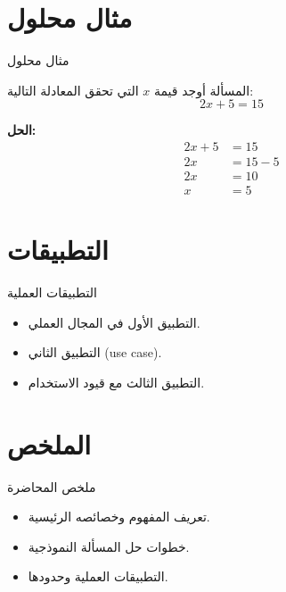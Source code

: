 \documentclass[aspectratio=169,11pt]{beamer}
\let\textEN\textenglish
\begin{document}
\section{مثال محلول}

\begin{frame}{مثال محلول}
\begin{block}{المسألة}
أوجد قيمة $x$ التي تحقق المعادلة التالية:
\[
2x + 5 = 15
\]
\end{block}

\textbf{الحل:}
\begin{align*}
2x + 5 &= 15 \\
2x &= 15 - 5 \\
2x &= 10 \\
x &= 5
\end{align*}
\end{frame}

\section{التطبيقات}

\begin{frame}{التطبيقات العملية}
\begin{itemize}
  \item التطبيق الأول في المجال العملي.
  \item التطبيق الثاني \textEN{(use case)}.
  \item التطبيق الثالث مع قيود الاستخدام.
\end{itemize}
\end{frame}

\section{الملخص}

\begin{frame}{ملخص المحاضرة}
\begin{itemize}
  \item تعريف المفهوم وخصائصه الرئيسية.
  \item خطوات حل المسألة النموذجية.
  \item التطبيقات العملية وحدودها.
\end{itemize}
\end{frame}
\end{document}
